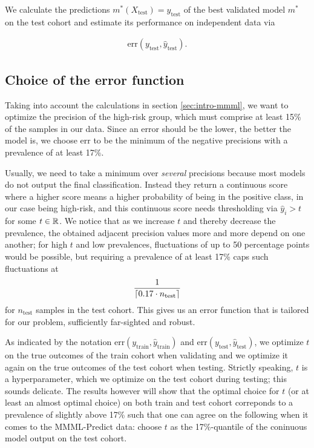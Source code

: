We calculate the predictions $m^*(X_\text{test}) = \hat{y}_\text{test}$ of the best validated model 
$m^*$ on the test cohort and estimate its performance on independent data via 

\begin{align}
    \text{err}(y_\text{test}, \hat{y}_\text{test}).
\end{align}

\subsection{Choice of the error function}\label{sec:error-function}

Taking into account the calculations in section \ref{sec:intro-mmml},
we want to optimize the precision of the high-risk group, which must comprise at least 15\% of the 
samples in our data. Since an error should be the lower, the better the model is, we choose 
$\text{err}$ to be the minimum of the negative precisions with a prevalence of at least 17\%. 

Usually, we need 
to take a minimum over \textit{several} precisions because most models do not output the final 
classification.
Instead they return a continuous score where a higher score means a higher probability of being
in the positive class, in our case being high-risk, and this continuous score needs thresholding
via $\hat{y}_i > t$ for some $t \in \RR$.
We notice that as we increase $t$ and thereby decrease the prevalence, the obtained 
adjacent precision values more and more depend on one another; for high $t$ and low 
prevalences, fluctuations of up to 50 percentage points would be possible, but requiring a 
prevalence of at least 17\% caps such fluctuations at 
\begin{align}
    \frac{1}{\ceil*{\num{0.17} \cdot n_\text{test}}}
\end{align}
for $n_\text{test}$ samples in the test cohort. This gives us an error function that is tailored 
for our problem, sufficiently far-sighted and robust.

As indicated by the notation $\text{err}(y_\text{train}, \hat{y}_\text{train})$ and 
$\text{err}(y_\text{test}, \hat{y}_\text{test})$, we optimize $t$ on the true outcomes 
of the train cohort when validating and we optimize it again on the true outcomes of the test cohort 
when testing. Strictly speaking, $t$ is a hyperparameter, which we optimize on the 
test cohort during testing; this sounds delicate. The results however will show that the optimal 
choice for $t$ (or at least an 
almost optimal choice) on both train and test cohort correponds to a prevalence of 
slightly above 17\% such that one can agree on the following when it comes to the MMML-Predict data: 
choose $t$ as the 17\%-quantile of the coninuous model output on the test cohort.

